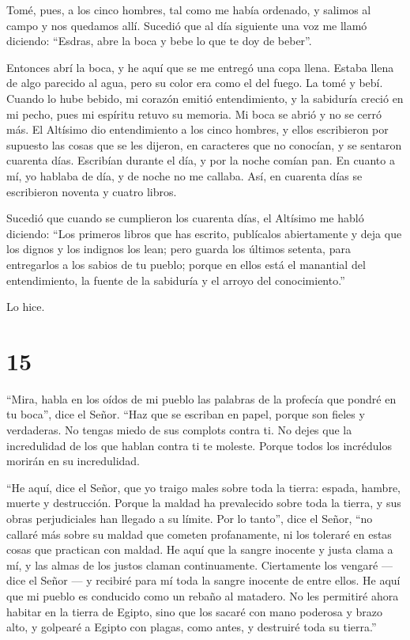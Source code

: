  Tomé, pues, a los cinco hombres, tal como me había
ordenado, y salimos al campo y nos quedamos allí. 
Sucedió que al día siguiente una voz me llamó diciendo: ``Esdras, abre
la boca y bebe lo que te doy de beber''.

 Entonces abrí la boca, y he aquí que se me entregó una
copa llena. Estaba llena de algo parecido al agua, pero su color era
como el del fuego.  La tomé y bebí. Cuando lo hube
bebido, mi corazón emitió entendimiento, y la sabiduría creció en mi
pecho, pues mi espíritu retuvo su memoria.  Mi boca se
abrió y no se cerró más.  El Altísimo dio entendimiento a
los cinco hombres, y ellos escribieron por supuesto las cosas que se les
dijeron, en caracteres que no conocían, y se sentaron cuarenta días.
Escribían durante el día, y por la noche comían pan.  En
cuanto a mí, yo hablaba de día, y de noche no me callaba.
 Así, en cuarenta días se escribieron noventa y cuatro
libros.

 Sucedió que cuando se cumplieron los cuarenta días, el
Altísimo me habló diciendo: ``Los primeros libros que has escrito,
publícalos abiertamente y deja que los dignos y los indignos los lean;
 pero guarda los últimos setenta, para entregarlos a los
sabios de tu pueblo;  porque en ellos está el manantial
del entendimiento, la fuente de la sabiduría y el arroyo del
conocimiento.''

 Lo hice.

\hypertarget{section-14}{%
\section{15}\label{section-14}}

 ``Mira, habla en los oídos de mi pueblo las palabras de
la profecía que pondré en tu boca'', dice el Señor.  ``Haz
que se escriban en papel, porque son fieles y verdaderas. 
No tengas miedo de sus complots contra ti. No dejes que la incredulidad
de los que hablan contra ti te moleste.  Porque todos los
incrédulos morirán en su incredulidad.

 ``He aquí, dice el Señor, que yo traigo males sobre toda
la tierra: espada, hambre, muerte y destrucción.  Porque
la maldad ha prevalecido sobre toda la tierra, y sus obras perjudiciales
han llegado a su límite.  Por lo tanto'', dice el Señor,
 ``no callaré más sobre su maldad que cometen
profanamente, ni los toleraré en estas cosas que practican con maldad.
He aquí que la sangre inocente y justa clama a mí, y las almas de los
justos claman continuamente.  Ciertamente los vengaré ---
dice el Señor --- y recibiré para mí toda la sangre inocente de entre
ellos.  He aquí que mi pueblo es conducido como un rebaño
al matadero. No les permitiré ahora habitar en la tierra de Egipto,
 sino que los sacaré con mano poderosa y brazo alto, y
golpearé a Egipto con plagas, como antes, y destruiré toda su tierra.''

